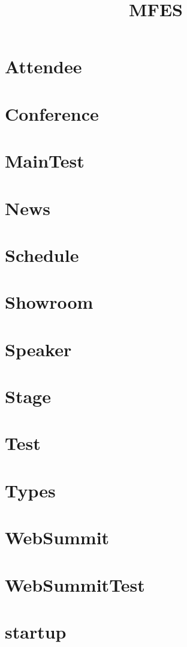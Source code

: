 \documentclass{article}
\begin{document}
\title{MFES}
\author{}
\maketitle
\tableofcontents

\section{Attendee}

\section{Conference}

\section{MainTest}

\section{News}

\section{Schedule}

\section{Showroom}

\section{Speaker}

\section{Stage}

\section{Test}

\section{Types}

\section{WebSummit}

\section{WebSummitTest}

\section{startup}

\end{document}
